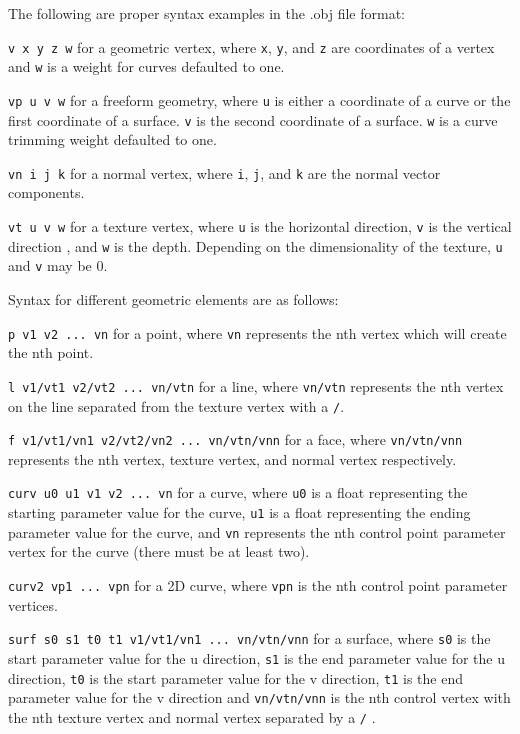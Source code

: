 \documentclass[12pt]{article}
\begin{document}
The following are proper syntax examples in the .obj file format:

\texttt{v\ x\ y\ z\ w} for a geometric vertex, where \texttt{x},
\texttt{y}, and \texttt{z} are coordinates of a vertex and \texttt{w} is
a weight for curves defaulted to one.

\texttt{vp\ u\ v\ w} for a freeform geometry, where \texttt{u} is either
a coordinate of a curve or the first coordinate of a surface. \texttt{v}
is the second coordinate of a surface. \texttt{w} is a curve trimming
weight defaulted to one.

\texttt{vn\ i\ j\ k} for a normal vertex, where \texttt{i}, \texttt{j},
and \texttt{k} are the normal vector components.

\texttt{vt\ u\ v\ w} for a texture vertex, where \texttt{u} is the
horizontal direction, \texttt{v} is the vertical direction , and
\texttt{w} is the depth. Depending on the dimensionality of the texture,
\texttt{u} and \texttt{v} may be 0.

Syntax for different geometric elements are as follows:

\texttt{p\ v1\ v2\ ...\ vn} for a point, where \texttt{vn} represents
the nth vertex which will create the nth point.

\texttt{l\ v1/vt1\ v2/vt2\ ...\ vn/vtn} for a line, where
\texttt{vn/vtn} represents the nth vertex on the line separated from the
texture vertex with a \texttt{/}.

\texttt{f\ v1/vt1/vn1\ v2/vt2/vn2\ ...\ vn/vtn/vnn} for a face, where
\texttt{vn/vtn/vnn} represents the nth vertex, texture vertex, and
normal vertex respectively.

\texttt{curv\ u0\ u1\ v1\ v2\ ...\ vn} for a curve, where \texttt{u0} is
a float representing the starting parameter value for the curve,
\texttt{u1} is a float representing the ending parameter value for the
curve, and \texttt{vn} represents the nth control point parameter vertex
for the curve (there must be at least two).

\texttt{curv2\ vp1\ ...\ vpn} for a 2D curve, where \texttt{vpn} is the
nth control point parameter vertices.

\texttt{surf\ s0\ s1\ t0\ t1\ v1/vt1/vn1\ ...\ vn/vtn/vnn} for a
surface, where \texttt{s0} is the start parameter value for the u
direction, \texttt{s1} is the end parameter value for the u direction,
\texttt{t0} is the start parameter value for the v direction,
\texttt{t1} is the end parameter value for the v direction and
\texttt{vn/vtn/vnn} is the nth control vertex with the nth texture
vertex and normal vertex separated by a \texttt{/} \autocite{obj}.
\end{document}
